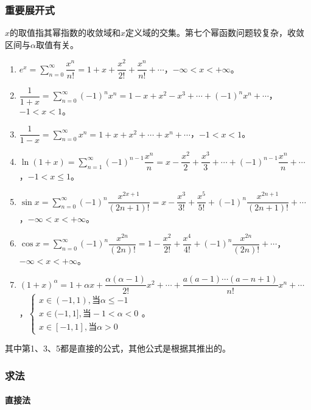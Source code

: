 \subsubsection{重要展开式}

$x$的取值指其幂指数的收敛域和$x$定义域的交集。第七个幂函数问题较复杂，收敛区间与$\alpha$取值有关。

\begin{enumerate}
    \item $e^x=\sum\limits_{n=0}^\infty\dfrac{x^n}{n!}=1+x+\dfrac{x^2}{2!}+\dfrac{x^n}{n!}+\cdots$，$-\infty<x<+\infty$。
    \item $\dfrac{1}{1+x}=\sum\limits_{n=0}^\infty(-1)^nx^n=1-x+x^2-x^3+\cdots+(-1)^nx^n+\cdots$，$-1<x<1$。
    \item $\dfrac{1}{1-x}=\sum\limits_{n=0}^\infty x^n=1+x+x^2+\cdots+x^n+\cdots$，$-1<x<1$。
    \item $\ln(1+x)=\sum\limits_{n=1}^\infty(-1)^{n-1}\dfrac{x^n}{n}=x-\dfrac{x^2}{2}+\dfrac{x^3}{3}+\cdots+(-1)^{n-1}\dfrac{x^n}{n}+\cdots$，$-1<x\leqslant1$。
    \item $\sin x=\sum\limits_{n=0}^\infty(-1)^n\dfrac{x^{2x+1}}{(2n+1)!}=x-\dfrac{x^3}{3!}+\dfrac{x^5}{5!}+(-1)^n\dfrac{x^{2n+1}}{(2n+1)!}+\cdots$，$-\infty<x<+\infty$。
    \item $\cos x=\sum\limits_{n=0}^\infty(-1)^n\dfrac{x^{2n}}{(2n)!}=1-\dfrac{x^2}{2!}+\dfrac{x^4}{4!}+(-1)^n\dfrac{x^{2n}}{(2n)!}+\cdots$，$-\infty<x<+\infty$。
    \item $(1+x)^\alpha=1+\alpha x+\dfrac{\alpha(\alpha-1)}{2!}x^2+\cdots+\dfrac{a(a-1)\cdots(a-n+1)}{n!}x^n+\cdots$，$\left\{\begin{array}{l}
        x\in(-1,1),\text{当}\alpha\leqslant-1 \\
        x\in(-1,1],\text{当}-1<\alpha<0 \\
        x\in[-1,1],\text{当}\alpha>0
    \end{array}\right.$。
\end{enumerate}

其中第1、3、5都是直接的公式，其他公式是根据其推出的。

\subsubsection{求法}

\paragraph{直接法} \leavevmode \medskip

